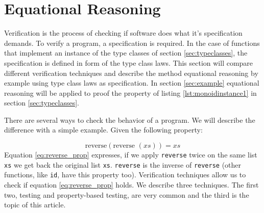 \section{Equational Reasoning}
\label{sec:equationalreasoning}

Verification is the process of checking if software does what it's specification demands. To verify a program, a specification is required. In the case of functions that implement an instance of the type classes of section \ref{sec:typeclasses}, the specification is defined in form of the type class laws.
This section will compare different verification techniques and describe the method equational reasoning by example using type class laws as specification. In section \ref{sec:example} equational reasoning will be applied to proof the property of listing \ref{lst:monoidinstance1} in section \ref{sec:typeclasses}.

There are several ways to check the behavior of a program. 
We will describe the difference with a simple example. Given the following property:

\begin{equation}
  \label{eq:reverse_prop}
\text{reverse} (\text{reverse } (xs)) = xs  
\end{equation}
Equation \ref{eq:reverse_prop} expresses, if we apply \verb|reverse| twice on the same list \verb|xs| we get back the original list \verb|xs|. \verb|reverse| is the inverse of \verb|reverse| (other functions, like \verb|id|, have this property too). Verification techniques allow us to check if equation \ref{eq:reverse_prop} holds. We describe three techniques. The first two, testing and property-based testing, are very common and the third is the topic of this article.

